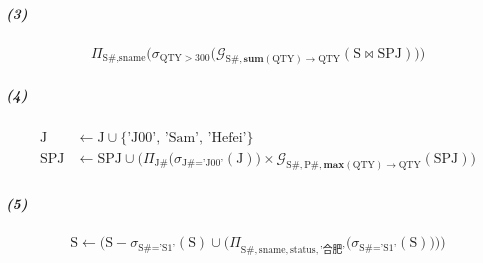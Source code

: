 \documentclass{article}
\begin{document}
\subparagraph{(3)}
\begin{Large}
\begin{equation*}
    \Pi_{\text{S\#}, \text{sname}}\Big(\sigma_{\text{QTY} > 300}\big(\mathcal{G}_{\text{S\#}, \textbf{sum}(\text{QTY}) \rightarrow \text{QTY}}(\text{S} \Join \text{SPJ})\big)\Big)
\end{equation*}
\end{Large}

\subparagraph{(4)}
\begin{Large}
\begin{align*}
    \text{J} & \leftarrow \text{J} \cup \{\text{'J00'},\, \text{'Sam'},\, \text{'Hefei'}\} \\
    \text{SPJ} & \leftarrow \text{SPJ} \cup \Big(\Pi_{\text{J\#}}\big(\sigma_{\text{J\#} = \text{'J00'}}(\text{J})\big) \times \mathcal{G}_{\text{S\#}, \text{P\#}, \textbf{max}(\text{QTY}) \rightarrow \text{QTY}}(\text{SPJ})\Big)
\end{align*}
\end{Large}

\subparagraph{(5)}
\begin{Large}
\begin{equation*}
    \text{S} \leftarrow \bigg(\text{S} - \sigma_{\text{S\#} = \text{'S1'}}(\text{S}) \cup \Big(\Pi_{\text{S\#}, \text{sname}, \text{status}, \text{'合肥'}}\big(\sigma_{\text{S\#} = \text{'S1'}}(\text{S})\big)\Big)\bigg)
\end{equation*}
\end{Large}
\end{document}

